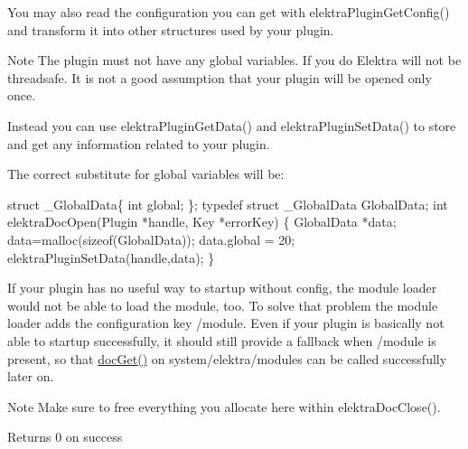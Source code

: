You may also read the configuration you can get with elektra\-Plugin\-Get\-Config() and transform it into other structures used by your plugin.

\begin{DoxyNote}{Note}
The plugin must not have any global variables. If you do Elektra will not be threadsafe. It is not a good assumption that your plugin will be opened only once.
\end{DoxyNote}
Instead you can use elektra\-Plugin\-Get\-Data() and elektra\-Plugin\-Set\-Data() to store and get any information related to your plugin.

The correct substitute for global variables will be\-: 
\begin{DoxyCode}
\textcolor{keyword}{struct }\_GlobalData\{ \textcolor{keywordtype}{int} global; \};
\textcolor{keyword}{typedef} \textcolor{keyword}{struct }\_GlobalData GlobalData;
\textcolor{keywordtype}{int} elektraDocOpen(Plugin *handle, Key *errorKey)
\{
        GlobalData *data;
        data=malloc(\textcolor{keyword}{sizeof}(GlobalData));
        data.global = 20;
        elektraPluginSetData(handle,data);
\}
\end{DoxyCode}


If your plugin has no useful way to startup without config, the module loader would not be able to load the module, too. To solve that problem the module loader adds the configuration key /module. Even if your plugin is basically not able to startup successfully, it should still provide a fallback when /module is present, so that \hyperlink{group__plugin_ga2f14a12b205687a31e6fd0645470ec69}{doc\-Get()} on system/elektra/modules can be called successfully later on.

\begin{DoxyNote}{Note}
Make sure to free everything you allocate here within elektra\-Doc\-Close().
\end{DoxyNote}
\begin{DoxyReturn}{Returns}
0 on success 
\end{DoxyReturn}

